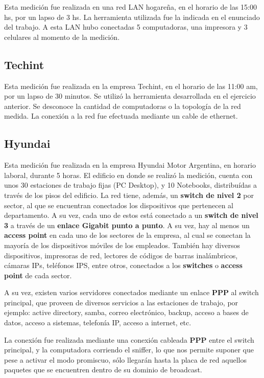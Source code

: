 \documentclass[final,inline,a4paper,narroweqnarray]{ieee}
\begin{document}
  Esta medición fue realizada en una red LAN hogareña, en el
  horario de las 15:00 hs, por un lapso de 3 hs. La herramienta
  utilizada fue la indicada en el enunciado del trabajo. A esta LAN
  hubo conectadas 5 computadoras, una impresora y 3 celulares al
  momento de la medición.

\subsection{Techint}

  Esta medición fue realizada en la empresa Techint, en el horario de
  las 11:00 am, por un lapso de 30 minutos. Se utilizó la herramienta
  desarrollada en el ejercicio anterior. Se desconoce la cantidad de
  computadoras o la topología de la red medida. La conexión a la red
  fue efectuada mediante un cable de ethernet.


\subsection{Hyundai}

  Esta medición fue realizada en la empresa Hyundai Motor Argentina,
  en horario laboral, durante 5 horas. El edificio en donde se realizó
  la medición, cuenta con unos 30 estaciones de trabajo fijas (PC
  Desktop), y 10 Notebooks, distribuídas a través de los pisos del
  edificio. La red tiene, además, un \textbf{switch de nivel 2} por
  sector, al que se encuentran conectados los dispositivos que
  pertenecen al departamento. A su vez, cada uno de estos está
  conectado a un \textbf{switch de nivel 3} a través de un
  \textbf{enlace Gigabit punto a punto}. A su vez, hay al menos un
  \textbf{access point} en cada uno de los sectores de la empresa, al
  cual se conectan la mayoría de los dispositivos móviles de los
  empleados. También hay diversos dispositivos, impresoras de red,
  lectores de códigos de barras inalámbricos, cámaras IPs, teléfonos
  IPS, entre otros, conectados a los
  \textbf{switches} o \textbf{access point} de cada sector.

  A su vez, existen varios servidores conectados mediante un enlace
  \textbf{PPP} al switch principal, que proveen de diversos servicios a las
  estaciones de trabajo, por ejemplo: active directory, samba, correo
  electrónico, backup, acceso a bases de datos, acceso a sistemas,
  telefonía IP, acceso a internet, etc.

  La conexión fue realizada mediante una conexión cableada
  \textbf{PPP} entre el switch principal, y la computadora corriendo
  el sniffer, lo que nos permite suponer que pese a activar el modo
  promiscuo, sólo llegarán hasta la placa de red aquellos paquetes que
  se encuentren dentro de su dominio de broadcast.
\end{document}
